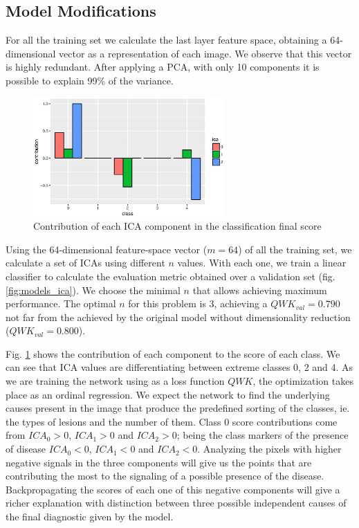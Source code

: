 \documentclass[preprint]{elsarticle}
\theoremstyle{definition} %
\theoremstyle{remark}
\begin{document}
\subsection{Model Modifications}

For all the training set we calculate the last layer feature space, obtaining a 64-dimensional vector as a representation of each image. We observe that this vector is highly redundant. After applying a PCA, with only 10 components it is possible to explain 99\% of the variance.

\begin{figure}[h]
	\centering	
	\includegraphics[width=0.65\textwidth]{figures/ica_class_contribution.eps}
	\caption{Contribution of each ICA component in the classification final score}
	\label{fig:ica_contribution}
\end{figure}

Using the 64-dimensional feature-space vector ($m=64$) of all the training set, we calculate a set of ICAs using different $n$ values. With each one, we train a linear classifier to calculate the evaluation metric obtained over a validation set (fig. \ref{fig:models_ica}). We choose the minimal $n$ that allows achieving maximum performance. The optimal $n$ for this problem is $3$, achieving a $QWK_{val} = 0.790$ not far from the achieved by the original model without dimensionality reduction ($QWK_{val} = 0.800$).

Fig. \ref{fig:ica_contribution} shows the contribution of each component to the score of each class. We can see that ICA values are differentiating between extreme classes 0, 2 and 4. As we are training the network using as a loss function $QWK$, the optimization takes place as an ordinal regression. We expect the network to find the underlying causes present in the image that produce the predefined sorting of the classes, ie. the types of lesions and the number of them. Class 0 score contributions come from $ICA_0 > 0$, $ICA_1 > 0$ and $ICA_2 > 0$; being the class markers of the presence of disease $ICA_0 < 0$, $ICA_1 < 0$ and $ICA_2 < 0$. Analyzing the pixels with higher negative signals in the three components will give us the points that are contributing the most to the signaling of a possible presence of the disease. Backpropagating the scores of each one of this negative components will give a richer explanation with distinction between three possible independent causes of the final diagnostic given by the model.
\end{document}
